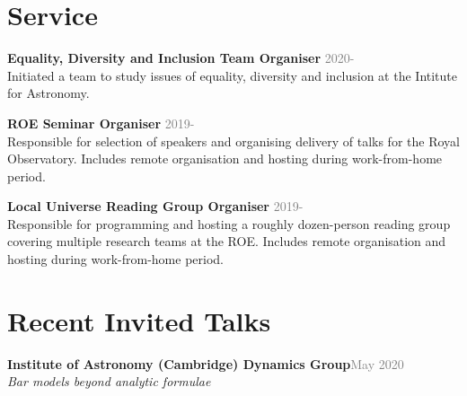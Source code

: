 \documentclass[margin, a4paper,11pt]{res} %
\begin{document}
\begin{resume}

\section{\sc \textcolor{redshade}{Service}}

{\bf Equality, Diversity and Inclusion Team Organiser} \hfill\textcolor{grey}{2020-}\\
Initiated a team to study issues of equality, diversity and inclusion at the Intitute for Astronomy.

{\bf ROE Seminar Organiser} \hfill\textcolor{grey}{2019-}\\
Responsible for selection of speakers and organising delivery of talks for the Royal Observatory. Includes remote organisation and hosting during work-from-home period.

{\bf Local Universe Reading Group Organiser} \hfill\textcolor{grey}{2019-}\\
Responsible for programming and hosting a roughly dozen-person reading group covering multiple research teams at the ROE. Includes remote organisation and hosting during work-from-home period.




%



\section{\sc \textcolor{redshade}{Recent Invited Talks}}
{\bf Institute of Astronomy (Cambridge) Dynamics Group}\hfill\textcolor{grey}{May 2020} \\
{\it Bar models beyond analytic formulae}


\end{resume}
\end{document}
